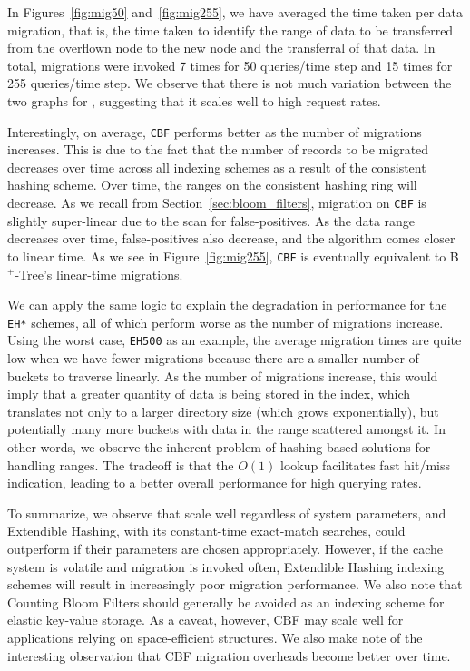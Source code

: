 In Figures~\ref{fig:mig50} and~\ref{fig:mig255}, we have averaged the time
taken per data migration, that is, the time taken to identify the range of data
to be transferred from the overflown node to the new node and the transferral
of that data. In total, migrations were invoked 7 times for 50 queries/time
step and 15 times for 255 queries/time step. We observe that there is not much
variation between the two graphs for \bptrees, suggesting that it scales well
to high request rates.

Interestingly, on average, {\tt CBF} performs better as the number of
migrations increases. This is due to the fact that the number of records to
be migrated decreases over time across all indexing schemes as a result of the
consistent hashing scheme. Over time, the ranges on the consistent hashing ring
will decrease. As we recall from Section~\ref{sec:bloom_filters}, migration on
{\tt CBF} is slightly super-linear due to the scan for false-positives. As the
data range decreases over time, false-positives also decrease, and the
algorithm comes closer to linear time. As we see in Figure~\ref{fig:mig255},
{\tt CBF} is eventually equivalent to B$^+$-Tree's linear-time migrations.

We can apply the same logic to explain the degradation in performance for the
{\tt EH*} schemes, all of which perform worse as the number of migrations
increase. Using the worst case, {\tt EH500} as an example, the average
migration times are quite low when we have fewer migrations because there are a
smaller number of buckets to traverse linearly. As the number of migrations
increase, this would imply that a greater quantity of data is being stored in
the index, which translates not only to a larger directory size (which grows
exponentially), but potentially many more buckets with data in the range
scattered amongst it. In other words, we observe the inherent problem of
hashing-based solutions for handling ranges. The tradeoff is that the $O(1)$
lookup facilitates fast hit/miss indication, leading to a better overall
performance for high querying rates.

To summarize, we observe that \bptrees scale well regardless of system
parameters, and Extendible Hashing, with its constant-time exact-match
searches, could outperform \bptrees if their parameters are chosen
appropriately. However, if the cache system is volatile and migration is
invoked often, Extendible Hashing indexing schemes will result in increasingly
poor migration performance. We also note that Counting Bloom Filters should
generally be avoided as an indexing scheme for elastic key-value storage. As a
caveat, however, CBF may scale well for applications relying on space-efficient
structures. We also make note of the interesting observation that CBF migration
overheads become better over time.

